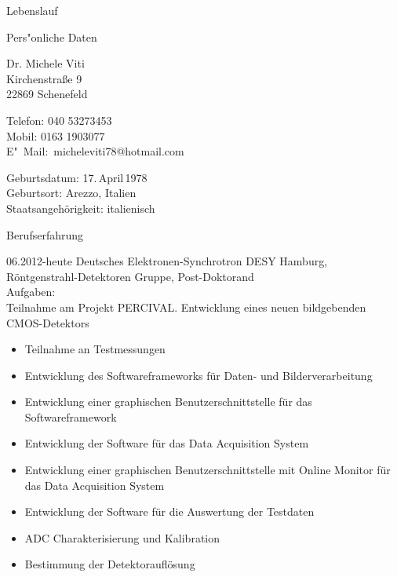\documentclass[11pt,a4paper]{scrartcl}
\begin{document}
\begin{cv}{Lebenslauf}
  \begin{cvlist}{Pers"onliche Daten}
  \item Dr. Michele Viti\\
    Kirchenstra{\ss}e 9\\
    22869 Schenefeld
  \item Telefon: 040 53273453\\
    Mobil: 0163 1903077\\
    E"~Mail:~micheleviti78@hotmail.com
  \item Geburtsdatum: 17.\,April\,1978\\
    Geburtsort: Arezzo, Italien\\
    Staatsangeh\"origkeit: italienisch
  \end{cvlist}
  
  \begin{cvlist}{Berufserfahrung}

  \item[06.2012-heute] Deutsches Elektronen-Synchrotron DESY Hamburg,
    R{\"o}ntgenstrahl-Detektoren Gruppe, Post-Doktorand\\

    Aufgaben:\\
    
    Teilnahme am Projekt PERCIVAL. Entwicklung eines neuen 
    bildgebenden CMOS-Detektors
    \begin{itemize}
    \item Teilnahme an Testmessungen
    \item Entwicklung des Softwareframeworks f{\"u}r Daten- und
      Bilderverarbeitung 
    \item Entwicklung einer graphischen Benutzerschnittstelle f{\"u}r  das Softwareframework
    \item Entwicklung der Software f{\"u}r das Data Acquisition
      System
    \item Entwicklung einer graphischen Benutzerschnittstelle mit Online
      Monitor f{\"u}r das Data Acquisition System
    \item Entwicklung der Software f{\"u}r die Auswertung der Testdaten
    \item ADC Charakterisierung und Kalibration
    \item Bestimmung der Detektoraufl{\"o}sung 
    \end{itemize}
      

\end{cvlist}
\end{cv}
\end{document}
